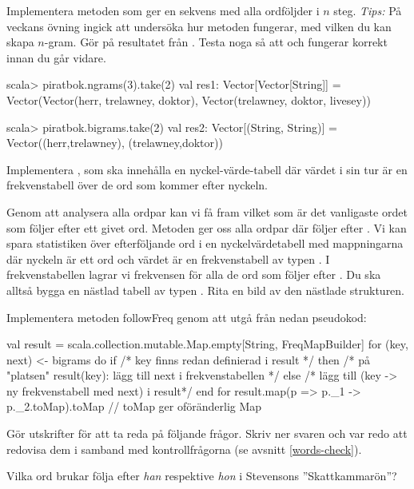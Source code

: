 \Task Implementera metoden  som ger en sekvens med alla ordföljder i $n$ steg. \emph{Tips:} På veckans övning ingick att undersöka hur metoden  fungerar, med vilken du kan skapa $n$-gram. Gör  på resultatet från . Testa noga så att  och  fungerar korrekt innan du går vidare.
\begin{REPL}
scala> piratbok.ngrams(3).take(2)
val res1: Vector[Vector[String]] =
  Vector(Vector(herr, trelawney, doktor), Vector(trelawney, doktor, livesey))

scala> piratbok.bigrams.take(2)
val res2: Vector[(String, String)] =
  Vector((herr,trelawney), (trelawney,doktor))
\end{REPL}

\Task Implementera , som ska innehålla en nyckel-värde-tabell där värdet i sin tur är en frekvenstabell över de ord som kommer efter nyckeln. \label{task-follow-freq}

Genom att analysera alla ordpar kan vi få fram vilket som är det vanligaste ordet som följer efter ett givet ord. Metoden  ger oss alla ordpar  där  följer efter . Vi kan spara statistiken över efterföljande ord i en nyckelvärdetabell med mappningarna  där nyckeln  är ett ord  och värdet  är en frekvenstabell av typen . I frekvenstabellen lagrar vi frekvensen för alla de ord som följer efter . Du ska alltså bygga en nästlad tabell av typen . Rita en bild av den nästlade strukturen.\Pen

Implementera metoden followFreq genom att utgå från nedan pseudokod:
\begin{Code}
val result = scala.collection.mutable.Map.empty[String, FreqMapBuilder]
for (key, next) <- bigrams do
  if /* key finns redan definierad i result */ then
    /* på "platsen" result(key): lägg till next i frekvenstabellen */
  else
    /* lägg till (key -> ny frekvenstabell med next) i result*/
end for
result.map(p => p._1 -> p._2.toMap).toMap // toMap ger oföränderlig Map
\end{Code}
Gör utskrifter för att ta reda på följande frågor. Skriv ner svaren och var redo att redovisa dem i samband med kontrollfrågorna (se avsnitt \ref{words-check}).\Pen

\Subtask Vilka ord brukar följa efter \emph{han} respektive \emph{hon} i Stevensons ''Skattkammarön''?

